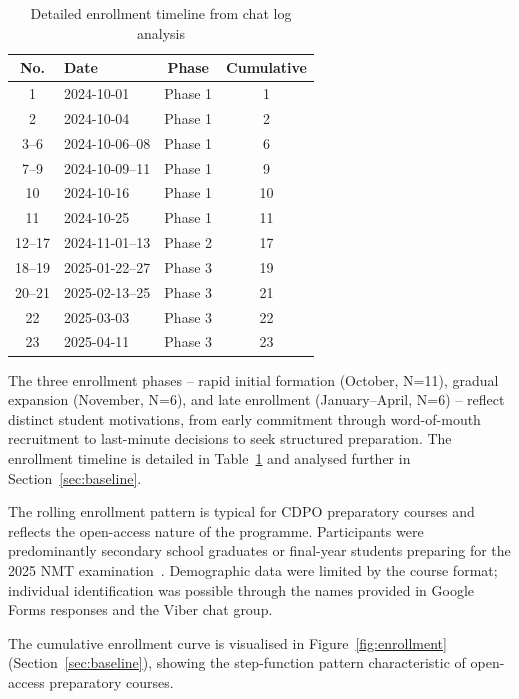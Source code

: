 \begin{table}[!h]
\centering
\caption{Detailed enrollment timeline from chat log analysis}
\label{tab:enrollment-detail}
\small
\begin{tabular}{clcc}
\hline
\textbf{No.} & \textbf{Date} & \textbf{Phase} & \textbf{Cumulative} \\
\hline
1 & 2024-10-01 & Phase 1 & 1 \\
2 & 2024-10-04 & Phase 1 & 2 \\
3--6 & 2024-10-06--08 & Phase 1 & 6 \\
7--9 & 2024-10-09--11 & Phase 1 & 9 \\
10 & 2024-10-16 & Phase 1 & 10 \\
11 & 2024-10-25 & Phase 1 & 11 \\
12--17 & 2024-11-01--13 & Phase 2 & 17 \\
18--19 & 2025-01-22--27 & Phase 3 & 19 \\
20--21 & 2025-02-13--25 & Phase 3 & 21 \\
22 & 2025-03-03 & Phase 3 & 22 \\
23 & 2025-04-11 & Phase 3 & 23 \\
\hline
\end{tabular}
\end{table}

The three enrollment phases -- rapid initial formation (October, N=11), gradual expansion (November, N=6), and late enrollment (January--April, N=6) -- reflect distinct student motivations, from early commitment through word-of-mouth recruitment to last-minute decisions to seek structured preparation. The enrollment timeline is detailed in Table~\ref{tab:enrollment-detail} and analysed further in Section~\ref{sec:baseline}.

The rolling enrollment pattern is typical for CDPO preparatory courses and reflects the open-access nature of the programme. Participants were predominantly secondary school graduates or final-year students preparing for the 2025 NMT examination~\cite{MON}. Demographic data were limited by the course format; individual identification was possible through the names provided in Google Forms responses and the Viber chat group.

The cumulative enrollment curve is visualised in Figure~\ref{fig:enrollment} (Section~\ref{sec:baseline}), showing the step-function pattern characteristic of open-access preparatory courses.

